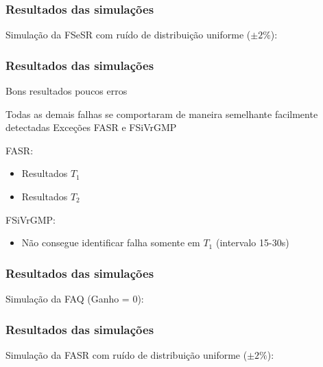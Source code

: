 \documentclass{beamer}
\begin{document}
\begin{frame}
    \frametitle{Resultados das simulações}

\footnotesize Simulação da FSeSR com ruído de distribuição uniforme ($\pm 2\%$):

\begin{figure}[htb]
\footnotesize
\centering
\scalebox{0.68}{}
\end{figure}
    
\end{frame}

\begin{frame}
    \frametitle{Resultados das simulações}

    Bons resultados \implica poucos erros

    \vspace{0.25cm}

    Todas as demais falhas se comportaram de maneira semelhante \implica
    facilmente detectadas \implica Exceções FASR e FSiVrGMP

    \vspace{0.25cm}

    FASR:

\begin{itemize}
    \item Resultados $T_1$ \alert{\Checkmark}
    \item Resultados $T_2$ \alert{\XSolidBrush}
\end{itemize}

    FSiVrGMP:

\begin{itemize}
    \item Não consegue identificar falha somente em $T_1$ (intervalo 15-30s)
\end{itemize}
\end{frame}

\begin{frame}
    \frametitle{Resultados das simulações}

\footnotesize Simulação da FAQ (Ganho = 0):

\begin{figure}[htb]
\footnotesize
\centering
\scalebox{0.68}{}
\end{figure}

\end{frame}

\begin{frame}
    \frametitle{Resultados das simulações}

\footnotesize Simulação da FASR com ruído de distribuição uniforme ($\pm 2\%$):

\begin{figure}[htb] 
\footnotesize 
\centering 
\scalebox{0.68}{}
\end{figure}
    
\end{frame}
\end{document}
